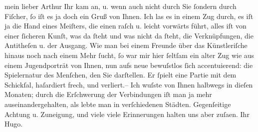 \pstart{}mein lieber Arthur\pend\vspace{0.5em}
\pstart
           Ihr \label{K_L02297-1v}\label{K_L02297-1}
               kam an, u. wenn auch nicht durch Sie{ }ſondern durch Fiſcher,{ }ſo iſt es ja doch ein Gruß von Ihnen. Ich las es in einem Zug
               durch, es iſt ja die Hand eines Meiſters, die einen raſch u. leicht vorwärts führt,
               alles iſt von einer{ }ſicheren Kunſt, was da{ }ſteht und was nicht da{ }ſteht, die
               Verknüpfungen, die Antitheſen u. der Ausgang. Wie man bei einem Freunde über das
               Künstleriſche hinaus noch nach {\pb}einem Mehr{ }ſucht,{ }ſo war mir hier{ }ſeltſam ein alter Zug wie aus einem Jugendporträt
               von Ihnen, nun aufs neue bewuſstlos{ }ſich accentuierend: die Spielernatur des
               Menſchen, den Sie darſtellen. Er{ }ſpielt eine Partie mit dem Schickſal, haſardiert
               frech, und verliert.\hspace*{1.5em}– Ich wuſste von Ihnen halbwegs
               in dieſen Monaten; durch die Erſchwerung der Verbindungen iſt man ja mehr
               auseinandergehalten, als lebte man in verſchiedenen Städten. Gegenſeitige Achtung u.
               Zuneigung, und viele viele Erinnerungen halten uns aber zuſa{\geminationm}en.\pend
           \pstart Ihr \spacefill\mbox{Hugo.}\pend{}\endnumbering{}  \newcommand{\dateiname}{L02297}\newcommand{\titel}{Hugo von Hofmannsthal an Arthur Schnitzler, 17. 8. [1918]}\newcommand{\editorInnen}{Martin Anton Müller und Gerd-Hermann Susen}
